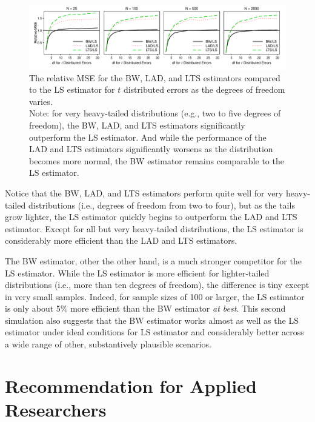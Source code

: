 \documentclass[12pt]{article}
\begin{document}
\begin{figure}[h!]
\begin{center}
\includegraphics[width = \textwidth]{figs/mc-sims.pdf}
\caption{The relative MSE for the BW, LAD, and LTS estimators compared to the LS estimator for $t$ distributed errors as the degrees of freedom varies. \\
Note: for very heavy-tailed distributions (e.g., two to five degrees of freedom), the BW, LAD, and LTS estimators significantly outperform the LS estimator. 
And while the performance of the LAD and LTS estimators significantly worsens as the distribution becomes more normal, the BW estimator remains comparable to the LS estimator.}\label{fig:mc-sims}
\end{center}
\end{figure}

Notice that the BW, LAD, and LTS estimators perform quite well for very heavy-tailed distributions (i.e., degrees of freedom from two to four), but as the tails grow lighter, the LS estimator quickly begins to outperform the LAD and LTS estimator. 
Except for all but very heavy-tailed distributions, the LS estimator is considerably more efficient than the LAD and LTS estimators. 

The BW estimator, other the other hand, is a much stronger competitor for the LS estimator. 
While the LS estimator is more efficient for lighter-tailed distributions (i.e., more than ten degrees of freedom), the difference is tiny except in very small samples. 
Indeed, for sample sizes of 100 or larger, the LS estimator is only about 5\% more efficient than the BW estimator \textit{at best}. 
This second simulation also suggests that the BW estimator works almost as well as the LS estimator under ideal conditions for LS estimator and considerably better across a wide range of other, substantively plausible scenarios.

\section*{Recommendation for Applied Researchers}
\end{document}
